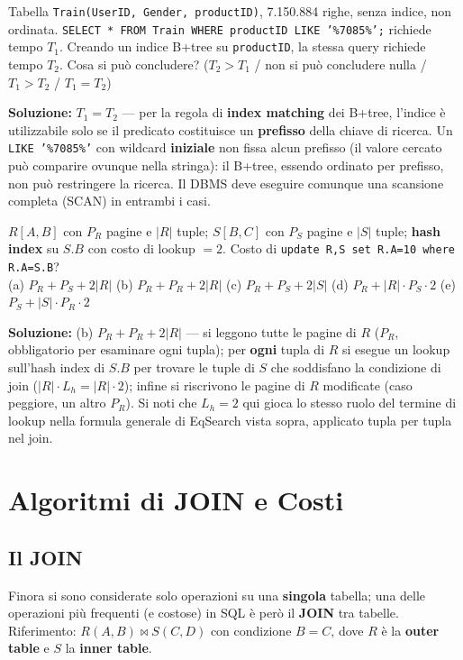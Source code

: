 \documentclass[12pt, a4paper]{article}
\begin{document}
\begin{tcolorbox}[colback=lightergray!10, colframe=tocsec, title=\textbf{Esercizio 2}]
Tabella \texttt{Train(UserID, Gender, productID)}, 7.150.884 righe, senza indice, non ordinata. \texttt{SELECT * FROM Train WHERE productID LIKE '\%7085\%';} richiede tempo $T_1$. Creando un indice B+tree su \texttt{productID}, la stessa query richiede tempo $T_2$. Cosa si può concludere? ($T_2>T_1$ / non si può concludere nulla / $T_1>T_2$ / $T_1=T_2$)
\end{tcolorbox}
\textbf{Soluzione:} $T_1=T_2$ — per la regola di \textbf{index matching} dei B+tree, l'indice è utilizzabile solo se il predicato costituisce un \textbf{prefisso} della chiave di ricerca. Un \texttt{LIKE '\%7085\%'} con wildcard \textbf{iniziale} non fissa alcun prefisso (il valore cercato può comparire ovunque nella stringa): il B+tree, essendo ordinato per prefisso, non può restringere la ricerca. Il DBMS deve eseguire comunque una scansione completa (SCAN) in entrambi i casi.

\begin{tcolorbox}[colback=lightergray!10, colframe=tocsec, title=\textbf{Esercizio 3}]
$R[A,B]$ con $P_R$ pagine e $|R|$ tuple; $S[B,C]$ con $P_S$ pagine e $|S|$ tuple; \textbf{hash index} su $S.B$ con costo di lookup $=2$. Costo di \texttt{update R,S set R.A=10 where R.A=S.B}? \\
(a) $P_R+P_S+2|R|$ \quad (b) $P_R+P_R+2|R|$ \quad (c) $P_R+P_S+2|S|$ \quad (d) $P_R+|R|\cdot P_S\cdot 2$ \quad (e) $P_S+|S|\cdot P_R\cdot 2$
\end{tcolorbox}
\textbf{Soluzione:} (b) $P_R+P_R+2|R|$ — si leggono tutte le pagine di $R$ ($P_R$, obbligatorio per esaminare ogni tupla); per \textbf{ogni} tupla di $R$ si esegue un lookup sull'hash index di $S.B$ per trovare le tuple di $S$ che soddisfano la condizione di join ($|R|\cdot L_h = |R|\cdot 2$); infine si riscrivono le pagine di $R$ modificate (caso peggiore, un altro $P_R$). Si noti che $L_h=2$ qui gioca lo stesso ruolo del termine di lookup nella formula generale di EqSearch vista sopra, applicato tupla per tupla nel join.

\section{Algoritmi di JOIN e Costi}

\subsection{Il JOIN}
Finora si sono considerate solo operazioni su una \textbf{singola} tabella; una delle operazioni più frequenti (e costose) in SQL è però il \textbf{JOIN} tra tabelle. Riferimento: $R(A,B) \bowtie S(C,D)$ con condizione $B=C$, dove $R$ è la \textbf{outer table} e $S$ la \textbf{inner table}.
\end{document}

